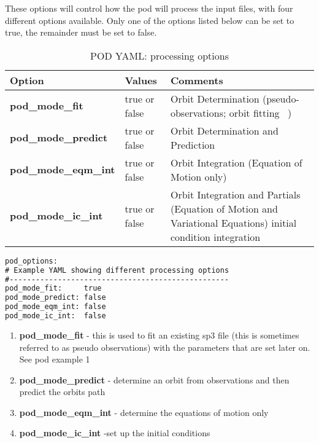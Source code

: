 These options will control how the pod will process the input files, with four different options available. Only one of the options listed below can be set to true, the remainder must be set to false.\\
\begin{table}[h!]
\begin{tabular}{|p{4.5cm}|p{2cm}|p{3.5cm}|}
	\hline
    Option & Values & Comments \\
    \hline
	\textbf{pod\_mode\_fit} & true or false & Orbit Determination (pseudo-observations; orbit fitting \ ) \\
	\textbf{pod\_mode\_predict} & true or false & Orbit Determination and Prediction \\
	\textbf{pod\_mode\_eqm\_int} & true or false & Orbit Integration (Equation of Motion only) \\
	\textbf{pod\_mode\_ic\_int} & true or false & Orbit Integration and Partials (Equation of Motion and Variational Equations) initial condition integration \\
	\hline
\end{tabular}
\caption{POD YAML: processing options}
\label{table:pod_yaml_processing_options}
\end{table}
%
\begin{lstlisting}[language=xml,caption=pod\_options yaml configuration example]
pod_options:
# Example YAML showing different processing options
#--------------------------------------------------
pod_mode_fit:     true   
pod_mode_predict: false  
pod_mode_eqm_int: false  
pod_mode_ic_int:  false  
\end{lstlisting}
%
\begin{enumerate}
	\item \textbf{pod\_mode\_fit} - this is used to fit an existing sp3 file (this is sometimes referred to as pseudo observations) with the parameters that are set later on. See pod example 1
	\item \textbf{pod\_mode\_predict} - determine an orbit from observations and then predict the orbits path
	\item \textbf{pod\_mode\_eqm\_int} - determine the equations of motion only
	\item \textbf{pod\_mode\_ic\_int} -set up the initial conditions
\end{enumerate}

